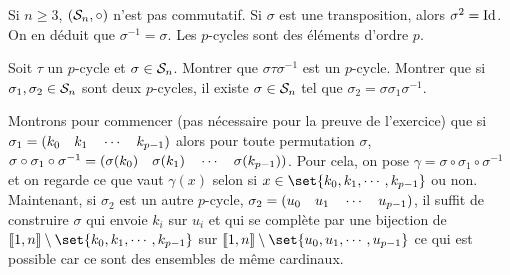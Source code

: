 \documentclass{magnolia}
\begin{document}
\begin{remarques}
\remarque Si $n\geq 3$, $(\mathcal{S}_{n},\circ)$ n'est pas commutatif.
\remarque Si $\sigma$ est une transposition, alors $\sigma^2=\operatorname{Id}$. On en déduit que
  $\sigma^{-1}=\sigma$. 
\remarque Les $p$-cycles sont des éléments d'ordre $p$.
\end{remarques}

\begin{exoUnique}
\exo Soit $\tau$ un $p$-cycle et $\sigma\in\mathcal{S}_{n}$. Montrer que
  $\sigma\tau\sigma^{-1}$ est un $p$-cycle.
\exo Montrer que si $\sigma_1,\sigma_2\in\mathcal{S}_{n}$ sont deux $p$-cycles, il
  existe $\sigma\in\mathcal{S}_{n}$ tel que $\sigma_2=\sigma \sigma_1 \sigma^{-1}$.
  \begin{sol}
  Montrons pour commencer (pas nécessaire pour la preuve de l'exercice) que si $\sigma_1=\left(k_0 \quad k_1 \quad \cdots \quad k_{p-1}\right)$ alors pour toute permutation $\sigma$, $\sigma \circ \sigma_1 \circ \sigma^{-1}=\left(\sigma(k_0) \quad \sigma(k_1) \quad \cdots \quad \sigma(k_{p-1})\right)$. Pour cela, on pose $\gamma=\sigma \circ \sigma_1 \circ \sigma^{-1}$ et on regarde ce que vaut $\gamma(x)$ selon si $x\in \set{k_0,k_1,\cdots,k_{p-1}}$ ou non.\\
  Maintenant, si $\sigma_2$ est un autre $p$-cycle, $\sigma_2=\left(u_0 \quad u_1 \quad \cdots \quad u_{p-1}\right)$, il suffit de construire $\sigma$ qui envoie $k_i$ sur $u_i$ et qui se complète par une bijection de $\intere{1}{n}\setminus \set{k_0,k_1,\cdots,k_{p-1}}$ sur $\intere{1}{n}\setminus \set{u_0,u_1,\cdots,u_{p-1}}$ ce qui est possible car ce sont des ensembles de même cardinaux.
  \end{sol}
\end{exoUnique}
\end{document}
